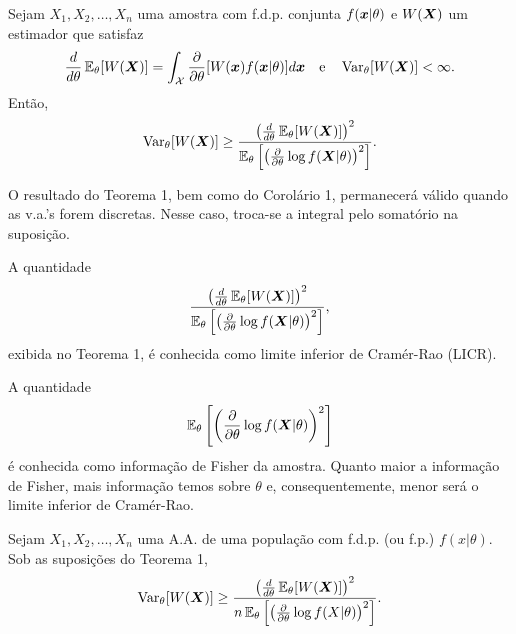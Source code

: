 \begin{theorem}
	Sejam $X_1, X_2, \ldots, X_n$ uma amostra com f.d.p. conjunta $f(\bm{x} | \theta)$ e $W(\bm{X})$ um estimador que satisfaz
	\[
	\frac{d}{d\theta} \operatorname{\mathbb{E}}_\theta[W(\bm{X})] = \int_{\mathcal{X}} \frac{\partial}{\partial\theta} [W(\bm{x})f(\bm{x} | \theta)]d\bm{x} \quad \text{e} \quad \operatorname{Var}_\theta[W(\bm{X})] < \infty.
	\]
	Então,
	\[
	\operatorname{Var}_\theta[W(\bm{X})] \geq \frac{\left(\frac{d}{d\theta} \operatorname{\mathbb{E}}_\theta[W(\bm{X})]\right)^2}{\operatorname{\mathbb{E}}_\theta\left[\left(\frac{\partial}{\partial\theta} \log f(\bm{X} | \theta)\right)^2\right]}.
	\]
	
	\begin{note}
		\leavevmode
		\begin{outline}[enumerate]
			\1 O resultado do Teorema 1, bem como do Corolário 1, permanecerá válido quando as v.a.'s forem discretas. Nesse caso, troca-se a integral pelo somatório na suposição.
	
			\1 A quantidade
			\[
			\frac{\left(\frac{d}{d\theta} \operatorname{\mathbb{E}}_\theta[W(\bm{X})]\right)^2}{\operatorname{\mathbb{E}}_\theta\left[\left(\frac{\partial}{\partial\theta} \log f(\bm{X} | \theta)\right)^2\right]},
			\]
			exibida no Teorema 1, é conhecida como limite inferior de Cramér-Rao (LICR).
		
			\1 A quantidade
			\[
			\operatorname{\mathbb{E}}_\theta\left[\left(\frac{\partial}{\partial\theta} \log f(\bm{X} | \theta)\right)^2\right]
			\]
			é conhecida como informação de Fisher da amostra. Quanto maior a informação de Fisher, mais informação temos sobre $\theta$ e, consequentemente, menor será o limite inferior de Cramér-Rao.
		\end{outline}
	\end{note}
\end{theorem}

\begin{theorem}
	Sejam $X_1, X_2, \ldots, X_n$ uma A.A. de uma população com f.d.p. (ou f.p.) $f(x | \theta)$. Sob as suposições do Teorema 1,
	\[
	\operatorname{Var}_\theta[W(\bm{X})] \geq \frac{\left(\frac{d}{d\theta} \operatorname{\mathbb{E}}_\theta[W(\bm{X})]\right)^2}{n\operatorname{\mathbb{E}}_\theta\left[\left(\frac{\partial}{\partial\theta} \log f(X | \theta)\right)^2\right]}.
	\]
\end{theorem}

